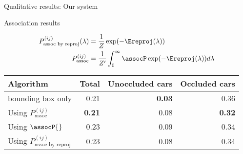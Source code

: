 \begin{frame}{Qualitative results: Our system}
  \centering


\end{frame}

\begin{frame}{Association results}

\begin{align}
  P^{(ij)}_{\text{assoc by reproj}}(\lambda) &= \frac{1}{Z}\exp(-\Ereproj(\lambda))\\
  P^{(ij)}_{\text{assoc}} &= \frac{1}{Z'}\int_0^{\infty} \assocP \exp(-\Ereproj(\lambda))d\lambda
  \label{eq:prob-assoc}
\end{align}
\begin{table}
  \centering
  \begin{tabular}{lrrr}
    \toprule
    Algorithm & Total & Unoccluded cars & Occluded cars \\
    \midrule
    bounding box only & 0.21 & \textbf{0.03}  & 0.36\\
    Using $P^{(ij)}_{\text{assoc}}$ & \textbf{0.21} & 0.08 & \textbf{0.32}\\
    Using $\assocP{}$ & 0.23 & 0.09 & 0.34 \\
    Using $P^{(ij)}_{\text{assoc by reproj}}$ & 0.23 & 0.08 & 0.34\\
    \bottomrule
  \end{tabular}
\end{table}
\end{frame}

